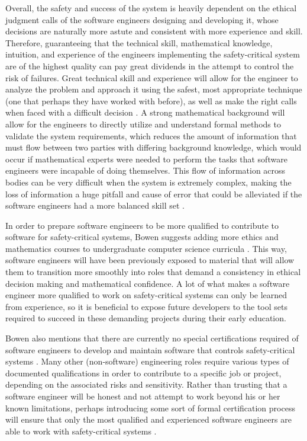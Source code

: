 \documentclass[12pt]{article}
\begin{document}
  Overall, the safety and success of the system is heavily dependent on the ethical judgment calls of the software engineers designing and developing it, whose decisions are naturally more astute and consistent with more experience and skill. Therefore, guaranteeing that the technical skill, mathematical knowledge, intuition, and experience of the engineers implementing the safety-critical system are of the highest quality can pay great dividends in the attempt to control the risk of failures. Great technical skill and experience will allow for the engineer to analyze the problem and approach it using the safest, most appropriate technique (one that perhaps they have worked with before), as well as make the right calls when faced with a difficult decision \cite{ref1}. A strong mathematical background will allow for the engineers to directly utilize and understand formal methods to validate the system requirements, which reduces the amount of information that must flow between two parties with differing background knowledge, which would occur if mathematical experts were needed to perform the tasks that software engineers were incapable of doing themselves. This flow of information across bodies can be very difficult when the system is extremely complex, making the loss of information a huge pitfall and cause of error that could be alleviated if the software engineers had a more balanced skill set \cite{ref1}.

  In order to prepare software engineers to be more qualified to contribute to software for safety-critical systems, Bowen suggests adding more ethics and mathematics courses to undergraduate computer science curricula \cite{ref1}. This way, software engineers will have been previously exposed to material that will allow them to transition more smoothly into roles that demand a consistency in ethical decision making and mathematical confidence. A lot of what makes a software engineer more qualified to work on safety-critical systems can only be learned from experience, so it is beneficial to expose future developers to the tool sets required to succeed in these demanding projects during their early education.

  Bowen also mentions that there are currently no special certifications required of software engineers to develop and maintain software that controls safety-critical systems \cite{ref1}. Many other (non-software) engineering roles require various types of documented qualifications in order to contribute to a specific job or project, depending on the associated risks and sensitivity. Rather than trusting that a software engineer will be honest and not attempt to work beyond his or her known limitations, perhaps introducing some sort of formal certification process will ensure that only the most qualified and experienced software engineers are able to work with safety-critical systems \cite{ref2}.
\end{document}
